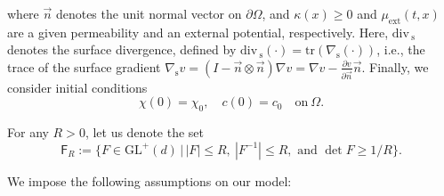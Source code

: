 \documentclass[a4paper,12pt]{article}
\newcommand{\ext}{\mathrm{ext}}
\newcommand{\pl}{\partial}
\newcommand{\DIV}{\mathrm{div\,}}
\newcommand{\GL}{\mathrm{GL}}
\newcommand{\tr}{\mathrm{tr}}
\theoremstyle{plain}
\theoremstyle{definition}
\numberwithin{equation}{section}
\begin{document}
	where $\vec{n}$ denotes the unit normal vector on $\pl\Omega$, and
	$\kappa(x)\geq 0$ and $\mu_{\ext}(t,x)$ are a given permeability and an external potential, respectively. 	Here, $\DIV\!_\text{s}$ denotes the surface divergence, defined by $\DIV\!_\text{s}(\cdot) = \tr(\nabla_\text{s}(\cdot))$, i.e., the trace of the surface gradient $\nabla_\text{s} v = (I-\Vec{n}\otimes\Vec{n})\nabla v = \nabla v - \frac{\pl v}{\pl\Vec{n}}\Vec{n}$. Finally, we consider initial conditions
	\begin{equation}
		\label{Eqn:FiniteStrainInitial}
		\chi(0) = \chi_0,\quad c(0) = c_0 \quad\text{on}\ \Omega.
	\end{equation}

	
For any $R>0$, let us denote the set 
\begin{equation}\label{eq:defSetFR}
	\mathsf{F}_R:= \big\{F\in \GL^+(d)\,\big|\,|F|\leq R,~|F^{-1}|\leq R,\text{ and }\det F \geq 1/R\big\}.
\end{equation}

	We impose the following assumptions on our model:
\end{document}
